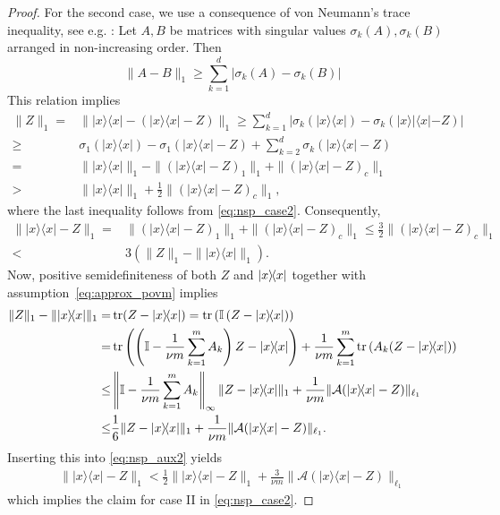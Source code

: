 \begin{proof}
For the second case, we use a consequence of von Neumann's trace inequality, see e.g. \cite[Theorem~7.4.9.1]{horn_topics_1991}: Let $ A,  B$ be matrices with singular values $\sigma_k ( A),\sigma_k ( B)$ arranged in non-increasing order.
Then
\begin{equation*}
  \|  A -  B \|_1 \geq \sum_{k=1}^d | \sigma_k ( A) - \sigma_k ( B)|
\end{equation*}
This relation implies
\begin{align*}
  \|  Z \|_1 =& \| |{x} \rangle \! \langle {x}| - (|{x} \rangle \! \langle {x}|- Z) \|_1
  \geq \sum_{k=1}^d \left| \sigma_k (| x \rangle \! \langle  x|) - \sigma_k (| x \rangle \! |\langle  x|-  Z ) \right| \\
  \geq & \sigma_1 (| x \rangle \langle  x|) - \sigma_1 \left( | x \rangle \! \langle  x| -  Z \right)+ \sum_{k=2}^d \sigma_k \left( | x \rangle \! \langle  x| -  Z\right) \\
  =&  \| | x \rangle \! \langle  x| \|_1  - \| (| x \rangle \! \langle  x| -  Z)_1 \|_1 + \|(| x \rangle \! \langle  x| - Z)_c \|_1 \\
  >& \| | x \rangle \! \langle  x| \|_1 + \frac{1}{2} \| (| x \rangle \! \langle  x|- Z)_c \|_1,
\end{align*}
where the last inequality follows from \eqref{eq:nsp_case2}. Consequently,
\begin{align}
  \| | x \rangle \! \langle  x| -  Z \|_1
  =& \| (| x \rangle \! \langle  x| -  Z)_1 \|_1 + \| (| x \rangle \! \langle  x|- Z)_c \|_1
  \leq \frac{3}{2} \| (| x \rangle \! \langle  x|-  Z )_c \|_1 \nonumber \\
  < & 3 \left( \|  Z \|_1 - \| | x \rangle \! \langle  x| \|_1 \right). \label{eq:nsp_aux2}
\end{align}
Now, positive semidefiniteness of both $ Z$ and $\ket{ x}\bra{ x}$ together with assumption~\eqref{eq:approx_povm} implies
\begin{align*}
  \|  Z \|_1 - \| |{x} \rangle \! \langle {x}| \|_1
  =& \tr ( Z-|{x} \rangle \! \langle {x}|) =  \tr \left( \mathbb{I} \left(  Z-| {x} \rangle \! \langle x|\right) \right) \\
  =&  \tr \left( \left( \mathbb{I} - \frac{1}{\nu m} \sum_{k=1}^m A_k \right)  Z-|{x} \rangle \! \langle {x}| \right) + \frac{1}{\nu m} \sum_{k=1}^m \tr \left( A_k ( Z-|{x} \rangle \! \langle {x}|) \right) \\
  \leq &  \left\|\mathbb{I}- \frac{1}{ \nu m} \sum_{k=1}^m A_k \right\|_\infty \|  Z-|{x} \rangle \! \langle {x}| \|_1 + \frac{1}{\nu m} \| \mathcal{A}(|{x} \rangle \! \langle {x}|- Z) \|_{\ell_1} \\
  \leq &  \frac{1}{6 } \|  Z-|{x} \rangle \! \langle {x}| \|_1 + \frac{1}{\nu m} \| \mathcal{A}(|{x} \rangle \! \langle {x}|- Z) \|_{\ell_1}.
\end{align*}
Inserting this into \eqref{eq:nsp_aux2} yields
\begin{align*}
\| | x \rangle \! \langle  x| -  Z \|_1 < \frac{1}{2} \| |{x} \rangle \! \langle {x}|- Z \|_1 +  \frac{3}{\nu m} \| \mathcal{A}(|{x} \rangle \! \langle {x}|- Z) \|_{\ell_1}
\end{align*}
which implies the claim for case II in \eqref{eq:nsp_case2}.
\end{proof}


